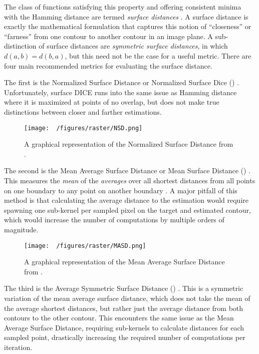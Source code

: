 The class of functions satisfying this property and offering consistent minima with the Hamming distance are termed \textit{surface distances} \cite{reinkeCommonLimitationsImage2023,reinkeUnderstandingMetricrelatedPitfalls2023}.
A surface distance is exactly the mathematical formulation that captures this notion of ``closeness'' or ``farness'' from one contour to another contour in an image plane.
A sub-distinction of surface distances are \emph{symmetric surface distances}, in which $d(a,b) = d(b,a)$, but this need not be the case for a useful metric.
There are four main recommended metrics for evaluating the surface distance.

The first is the Normalized Surface Distance or Normalized Surface Dice () \cite{nikolovClinicallyApplicableSegmentation2021} .
Unfortunately, surface DICE runs into the same issue as Hamming distance where it is maximized at points of no overlap, but does not make true distinctions between closer and farther estimations.

\begin{figure}[h!]
  \centering
  \texttt{[image: ~/figures/raster/NSD.png]}
  \caption{A graphical representation of the Normalized Surface Distance from \cite{reinkeUnderstandingMetricrelatedPitfalls2023,reinkeCommonLimitationsImage2023}.}
  \label{fig:surfDICE}
\end{figure}

The second is the Mean Average Surface Distance or Mean Surface Distance () \cite{benesPerformanceEvaluationImage2015}.
This measures the \emph{mean} of the \emph{averages} over all shortest distances from all points on one boundary to any point on another boundary \cite{reinkeCommonLimitationsImage2023,reinkeUnderstandingMetricrelatedPitfalls2023}.
A major pitfall of this method is that calculating the average distance to the estimation would require spawning one sub-kernel per sampled pixel on the target and estimated contour, which would increase the number of computations by multiple orders of magnitude.

\begin{figure}[h!]
  \centering
  \texttt{[image: ~/figures/raster/MASD.png]}
  \caption{A graphical representation of the Mean Average Surface Distance from \cite{reinkeCommonLimitationsImage2023,reinkeUnderstandingMetricrelatedPitfalls2023}.}
  \label{fig:MASD}
\end{figure}

The third is the Average Symmetric Surface Distance () \cite{yeghiazaryanFamilyBoundaryOverlap2018}.
This is a symmetric variation of the mean average surface distance, which does not take the mean of the average shortest distances, but rather just the average distance from both contours to the other contour.
This encounters the same issue as the Mean Average Surface Distance, requiring sub-kernels to calculate distances for each sampled point, drastically increasing the required number of computations per iteration.

